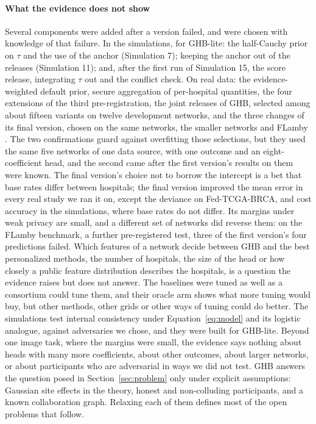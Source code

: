 \documentclass[acmsmall,screen,review]{acmart}
\theoremstyle{acmdefinition}
\begin{document}
\paragraph{What the evidence does not show} Several components were added after a version failed, and were chosen with knowledge of that failure. In the simulations, for GHB-lite: the half-Cauchy prior on $\tau$ and the use of the anchor (Simulation 7); keeping the anchor out of the releases (Simulation 11); and, after the first run of Simulation 15, the score release, integrating $\tau$ out and the conflict check. On real data: the evidence-weighted default prior, secure aggregation of per-hospital quantities, the four extensions of the third pre-registration, the joint releases of GHB, selected among about fifteen variants on twelve development networks, and the three changes of its final version, chosen on the same networks, the smaller networks and FLamby \cite{ogierduterrail2022flamby}. The two confirmations guard against overfitting those selections, but they used the same five networks of one data source, with one outcome and an eight-coefficient head, and the second came after the first version's results on them were known. The final version's choice not to borrow the intercept is a bet that base rates differ between hospitals; the final version improved the mean error in every real study we ran it on, except the deviance on Fed-TCGA-BRCA, and cost accuracy in the simulations, where base rates do not differ. Its margins under weak privacy are small, and a different set of networks did reverse them: on the FLamby \cite{ogierduterrail2022flamby} benchmark, a further pre-registered test, three of the first version's four predictions failed. Which features of a network decide between GHB and the best personalized methods, the number of hospitals, the size of the head or how closely a public feature distribution describes the hospitals, is a question the evidence raises but does not answer. The baselines were tuned as well as a consortium could tune them, and their oracle arm shows what more tuning would buy, but other methods, other grids or other ways of tuning could do better. The simulations test internal consistency under Equation~\eqref{eq:model} and its logistic analogue, against adversaries we chose, and they were built for GHB-lite. Beyond one image task, where the margins were small, the evidence says nothing about heads with many more coefficients, about other outcomes, about larger networks, or about participants who are adversarial in ways we did not test. GHB answers the question posed in Section~\ref{sec:problem} only under explicit assumptions: Gaussian site effects in the theory, honest and non-colluding participants, and a known collaboration graph. Relaxing each of them defines most of the open problems that follow.
\end{document}
